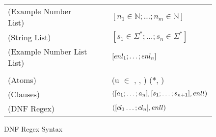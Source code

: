 \documentclass{article}
\begin{document}
\begin{figure}
\begin{tabular}{l@{\ }l@{\ }c@{\ }l}

(Example Number List)& \ExampleNumberList{} & \GEq{} & $[n_1 \in \mathbb{N};\ldots ;n_m \in \mathbb{N}]$ \\
(String List)& \StringList{} & \GEq{} & $[s_1 \in \Sigma^*;\ldots ;s_n \in \Sigma^*]$ \\
(Example Number List List)& \ExampleNumberListList{} & \GEq{} & $[enl_1;\ldots ;enl_n]$ \\
\\
(Atoms)& \Atom{} & \GEq{} & (u $\in$ \TypeContext{}, \StringList{}, \ExampleNumberListList{}) \GBar{} (\DNFRegex{}*, \ExampleNumberListList{}) \\
(Clauses)& \Clause{} & \GEq{} &
$([a_1 ; \ldots ; a_n], [s_1 ; \ldots ; s_{n+1}], enll{})$ \\
(DNF Regex)& \DNFRegex{} & \GEq{} & $([cl_1 \ldots ; cl_n], enll{})$ \\
\end{tabular}
\caption{DNF Regex Syntax}
\label{fig:refn-subgrammars}
\end{figure}
\end{document}

